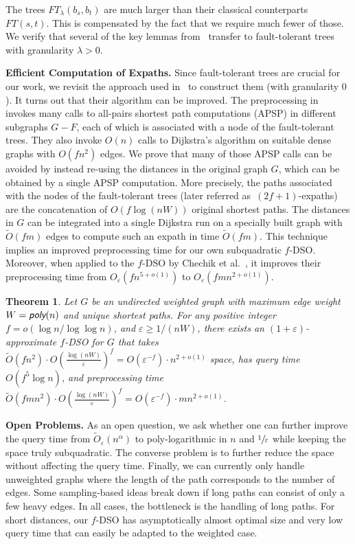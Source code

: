 \documentclass{article}\usepackage[a4paper,margin=20mm]{geometry}
\newtheorem{theorem}{Theorem}\newtheorem{lemma}[theorem]{Lemma}\newtheorem{proposition}[theorem]{Proposition}\newtheorem{corollary}[theorem]{Corollary}\newtheorem{definition}[theorem]{Definition}\newtheorem{claim}[theorem]{Claim}\newtheorem{remark}[theorem]{Remark}\newtheorem{observation}[theorem]{Observation}\newtheorem{conjecture}[theorem]{Conjecture}\newtheorem{example}[theorem]{Example}
\newcommand*{\Otilde}{\widetilde{O}}
\newcommand*{\poly}{\textsf{poly}}
\renewcommand{\ge}{\geqslant}
\newcommand{\eps}{\varepsilon}
\begin{document}
The trees $FT_\lambda(b_s, b_t)$ are much larger than their classical counterparts $FT(s,t)$.
This is compensated by the fact that we require much fewer of those. 
We verify that several of the key lemmas from~\cite{ChCoFiKa17} transfer to 
fault-tolerant trees with granularity $\lambda >0$. 
\vspace*{.5em}

\noindent
\textbf{Efficient Computation of Expaths.}
Since fault-tolerant trees are crucial for our work,
we revisit the approach used in~\cite{ChCoFiKa17} to construct them (with granularity $0$).
It turns out that their algorithm can be improved. 
The preprocessing in~\cite{ChCoFiKa17} invokes many calls to all-pairs shortest path computations (APSP) in different subgraphs $G-F$, each of which is associated with a node of the fault-tolerant trees. 
They also invoke $O(n)$ calls to Dijkstra's algorithm on suitable dense graphs with $O(fn^2)$ edges. 
We prove that many of those APSP calls can be avoided by instead re-using the distances in the original graph $G$, which can be obtained by a single APSP computation.
More precisely, the paths associated with the nodes of the fault-tolerant trees
(later referred as~$(2f+1)$-expaths) are the concatenation of $O(f \log (nW))$ original shortest paths.
The distances in $G$ can be integrated into a single Dijkstra run on a specially built graph with $\Otilde(fm)$ edges to compute such an expath in time $\Otilde(fm)$.
This technique implies an improved preprocessing time for our own subquadratic $f$-DSO.
Moreover, when applied to the $f$-DSO by Chechik et al.~\cite{ChCoFiKa17}, it improves their preprocessing time from $O_\varepsilon(fn^{5+o(1)})$ to $O_\varepsilon(fmn^{2+o(1)})$. 


\begin{theorem}
\label{thm:improved_preprocessing}
  Let $G$ be an undirected weighted graph with maximum edge weight $W = \emph{\poly}(n)$
  and unique shortest paths.
  For any positive integer $f = o(\log n/\log\log n)$,
  and $\varepsilon \ge 1/(nW)$,
  there exists an $(1{+}\varepsilon)$-approximate $f$-DSO for $G$ that takes
  $\Otilde(fn^2) \cdot O\!\left(\frac{\log(nW)}{\varepsilon}\right)^f 
    = O(\varepsilon^{-f}) \cdot n^{2+o(1)}$ space,
  has query time $O(f^5 \log n)$,
  and preprocessing time 
  $\Otilde(fmn^2) \cdot O\!\left(\frac{\log(nW)}{\varepsilon}\right)^f 
  	= O(\varepsilon^{-f}) \cdot mn^{2+o(1)}$.
\end{theorem} 


\noindent
\textbf{Open Problems.}
As an open question, we ask whether one can further improve the query time from 
$\Otilde_\eps(n^\alpha)$ to poly-logarithmic in $n$ and $\sfrac{1}{\eps}$ 
while keeping the space truly subquadratic.
The converse problem is to further reduce the space without affecting the query time.
Finally, we can currently only handle unweighted graphs
where the length of the path corresponds to the number of edges.
Some sampling-based ideas break down if long paths can consist of only a few heavy edges.
In all cases, the bottleneck is the handling of long paths.
For short distances, our $f$-DSO has asymptotically almost optimal size and very low query time that can easily be adapted to the weighted case.
\end{document}
